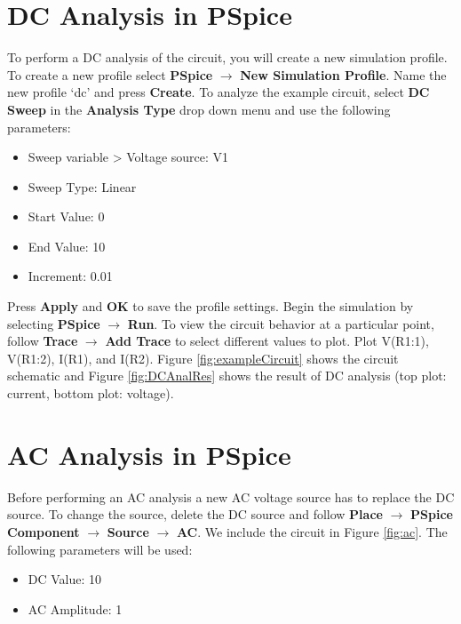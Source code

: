 \documentclass[12pt]{../manual}
\begin{document}
\section{DC Analysis in PSpice}
To perform a DC analysis of the circuit, you will create a new simulation profile. To create a new profile select \textbf{PSpice} $\to$ \textbf{New Simulation Profile}. Name the new profile `dc' and press \textbf{Create}. To analyze the example circuit, select \textbf{DC Sweep} in the \textbf{Analysis Type} drop down menu and use the following parameters:
\begin{itemize}
\item Sweep variable > Voltage source: V1
\item Sweep Type: Linear
\item Start Value: 0
\item End Value: 10
\item Increment: 0.01
\end{itemize}
Press \textbf{Apply} and \textbf{OK} to save the profile settings. Begin the simulation by selecting \textbf{PSpice} $\to$ \textbf{Run}. To view the circuit behavior at a particular point, follow \textbf{Trace} $\to$ \textbf{Add Trace} to select different values to plot. Plot V(R1:1), V(R1:2), I(R1), and I(R2). Figure \ref{fig:exampleCircuit} shows the circuit schematic and Figure \ref{fig:DCAnalRes} shows the result of DC analysis (top plot: current, bottom plot: voltage).
%
\newpage
\section{AC Analysis in PSpice}
Before performing an AC analysis a new AC voltage source has to replace the DC source. To change the source, delete the DC source and follow \textbf{Place} $\to$ \textbf{PSpice Component} $\to$ \textbf{Source} $\to$ \textbf{AC}. We include the circuit in Figure \ref{fig:ac}. The following parameters will be used: 
\begin{itemize}
\item DC Value: 10
\item AC Amplitude: 1
\end{itemize}

\end{document}
